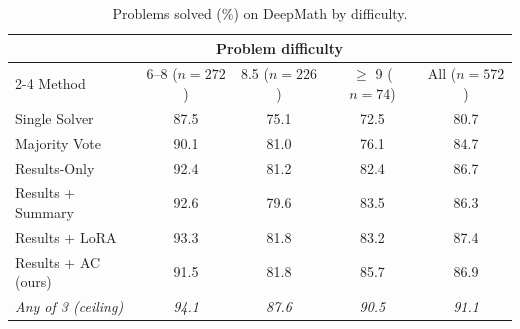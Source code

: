 \begin{table}[t]
\centering
\small
\begin{tabular}{lcccc}
\toprule
 & \multicolumn{3}{c}{Problem difficulty} & \\
\cmidrule(lr){2-4}
Method & 6--8 ($n{=}272$) & 8.5 ($n{=}226$) & $\geq$ 9 ($n{=}74$) & All ($n{=}572$) \\
\midrule
Single Solver       & 87.5 & 75.1 & 72.5 & 80.7 \\
Majority Vote       & 90.1 & 81.0 & 76.1 & 84.7 \\
Results-Only        & 92.4 & 81.2 & 82.4 & 86.7 \\
Results + Summary   & 92.6 & 79.6 & 83.5 & 86.3 \\
Results + LoRA      & 93.3 & 81.8 & 83.2 & 87.4 \\
Results + AC (ours) & 91.5 & 81.8 & 85.7 & 86.9 \\
\midrule
\textit{Any of 3 (ceiling)} & \textit{94.1} & \textit{87.6} & \textit{90.5} & \textit{91.1} \\
\bottomrule
\end{tabular}
\caption{Problems solved (\%) on DeepMath by difficulty.}
\label{tab:tqa_mvp}
\end{table}
